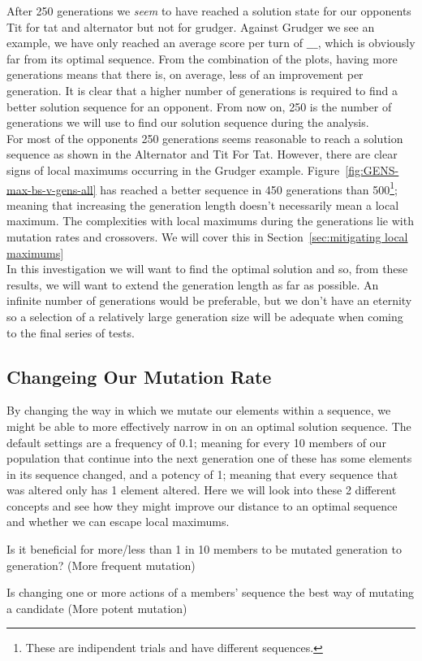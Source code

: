 After 250 generations we \textit{seem} to have reached a solution state for our opponents Tit for tat and alternator but not for grudger. 
Against Grudger we see an example, we have only reached an average score per turn of $\_\_\_$, which is obviously far from its optimal sequence.
From the combination of the plots, having more generations means that there is, on average, less of an improvement per generation.
It is clear that a higher number of generations is required to find a better solution sequence for an opponent.
From now on, 250 is the number of generations we will use to find our solution sequence during the analysis.\\ 

For most of the opponents 250 generations seems reasonable to reach a solution sequence as shown in the Alternator and Tit For Tat.
However, there are clear signs of local maximums occurring in the Grudger example. Figure~\ref{fig:GENS-max-bs-v-gens-all} has reached a better sequence in 450 generations than 500\footnote{These are indipendent trials and have different sequences.}; meaning that increasing the generation length doesn't necessarily mean a local maximum. 
The complexities with local maximums during the generations lie with mutation rates and crossovers.
We will cover this in Section~\ref{sec:mitigating local maximums}\\

In this investigation we will want to find the optimal solution and so, from these results, we will want to extend the generation length as far as possible.
An infinite number of generations would be preferable, but we don't have an eternity so a selection of a relatively large generation size will be adequate when coming to the final series of tests.\\

\subsection{Changeing Our Mutation Rate}
By changing the way in which we mutate our elements within a sequence, we might be able to more effectively narrow in on an optimal solution sequence.
The default settings are a frequency of 0.1; meaning for every 10 members of our population that continue into the next generation one of these has some elements in its sequence changed, and a potency of 1; meaning that every sequence that was altered only has 1 element altered.
Here we will look into these 2 different concepts and see how they might improve our distance to an optimal sequence and whether we can escape local maximums.
\begin{itemize}
    \begin{item}
        Is it beneficial for more/less than 1 in 10 members to be mutated generation to generation? (More frequent mutation)
    \end{item}
    \begin{item}
        Is changing one or more actions of a members' sequence the best way of mutating a candidate (More potent mutation)
    \end{item}
\end{itemize}
    
